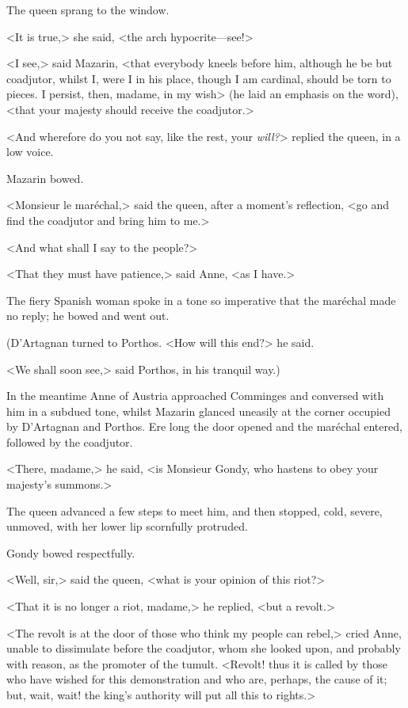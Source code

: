 The queen sprang to the window.

<It is true,> she said, <the arch hypocrite—see!>

<I see,> said Mazarin, <that everybody kneels before him, although he be but coadjutor, whilst I, were I in his place, though I am cardinal, should be torn to pieces. I persist, then, madame, in my wish> (he laid an emphasis on the word), <that your majesty should receive the coadjutor.>

<And wherefore do you not say, like the rest, your \textit{will?}> replied the queen, in a low voice.

Mazarin bowed.

<Monsieur le maréchal,> said the queen, after a moment's reflection, <go and find the coadjutor and bring him to me.>

<And what shall I say to the people?>

<That they must have patience,> said Anne, <as I have.>

The fiery Spanish woman spoke in a tone so imperative that the maréchal made no reply; he bowed and went out.

(D'Artagnan turned to Porthos. <How will this end?> he said.

<We shall soon see,> said Porthos, in his tranquil way.)

In the meantime Anne of Austria approached Comminges and conversed with him in a subdued tone, whilst Mazarin glanced uneasily at the corner occupied by D'Artagnan and Porthos. Ere long the door opened and the maréchal entered, followed by the coadjutor.

<There, madame,> he said, <is Monsieur Gondy, who hastens to obey your majesty's summons.>

The queen advanced a few steps to meet him, and then stopped, cold, severe, unmoved, with her lower lip scornfully protruded.

Gondy bowed respectfully.

<Well, sir,> said the queen, <what is your opinion of this riot?>

<That it is no longer a riot, madame,> he replied, <but a revolt.>

<The revolt is at the door of those who think my people can rebel,> cried Anne, unable to dissimulate before the coadjutor, whom she looked upon, and probably with reason, as the promoter of the tumult. <Revolt! thus it is called by those who have wished for this demonstration and who are, perhaps, the cause of it; but, wait, wait! the king's authority will put all this to rights.>

